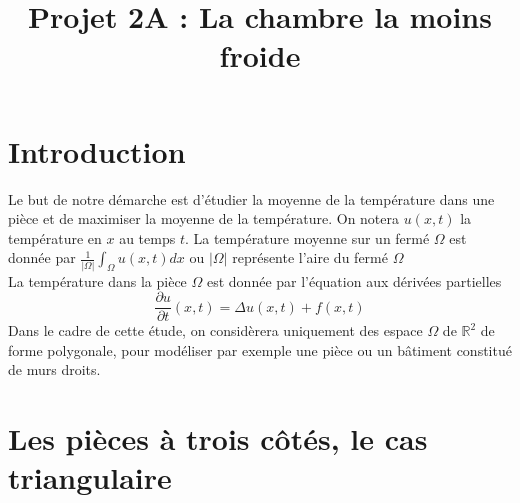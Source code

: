 \documentclass[a4paper,reqno]{article}
\begin{document}
\title{Projet 2A : La chambre la moins froide}
\maketitle
\newpage


\part*{Introduction}
Le but de notre démarche est d'étudier la moyenne de la température dans une pièce et de maximiser la moyenne de la température. On notera $u(x,t)$ la température en $x$ au temps $t$. 
La température moyenne sur un fermé $\Omega$ est donnée par $ \frac {1}{|\Omega|}\int_{\Omega} u(x,t) dx $ ou $|\Omega|$ représente l'aire du fermé $\Omega$ \\
\vspace{0,5cm}
La température dans la pièce $\Omega$ est donnée par l'équation aux dérivées partielles 
\begin{equation}
\frac{\partial u}{\partial t}(x,t) = \Delta u(x,t) + f(x,t)
\end{equation}
Dans le cadre de cette étude, on considèrera uniquement des espace $\Omega$ de $\mathbb{R}^2$ de forme polygonale, pour modéliser par exemple une pièce ou un bâtiment constitué de murs droits. 
\vspace{0,5cm}



\part{Les pièces à trois côtés, le cas triangulaire}

\end{document}
